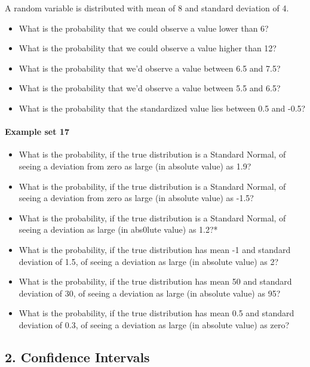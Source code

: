 \documentclass[]{article}
\providecommand{\tightlist}{%
  \setlength{\itemsep}{0pt}\setlength{\parskip}{0pt}}
\let\oldparagraph\paragraph
\renewcommand{\paragraph}[1]{\oldparagraph{#1}\mbox{}}
\begin{document}
A random variable is distributed with mean of 8 and standard deviation
of 4.

\begin{itemize}
\tightlist
\item
  What is the probability that we could observe a value lower than 6?
\item
  What is the probability that we could observe a value higher than 12?
\item
  What is the probability that we'd observe a value between 6.5 and 7.5?
\item
  What is the probability that we'd observe a value between 5.5 and 6.5?
\item
  What is the probability that the standardized value lies between 0.5
  and -0.5?
\end{itemize}

\paragraph{Example set 17}\label{example-set-17}

\begin{itemize}
\item
  What is the probability, if the true distribution is a Standard
  Normal, of seeing a deviation from zero as large (in absolute value)
  as 1.9?
\item
  What is the probability, if the true distribution is a Standard
  Normal, of seeing a deviation from zero as large (in absolute value)
  as -1.5?
\item
  What is the probability, if the true distribution is a Standard
  Normal, of seeing a deviation as large (in abs0lute value) as 1.2?*
\item
  What is the probability, if the true distribution has mean -1 and
  standard deviation of 1.5, of seeing a deviation as large (in absolute
  value) as 2?
\item
  What is the probability, if the true distribution has mean 50 and
  standard deviation of 30, of seeing a deviation as large (in absolute
  value) as 95?
\item
  What is the probability, if the true distribution has mean 0.5 and
  standard deviation of 0.3, of seeing a deviation as large (in absolute
  value) as zero?
\end{itemize}

\subsection{2. Confidence Intervals}\label{confidence-intervals}
\end{document}
